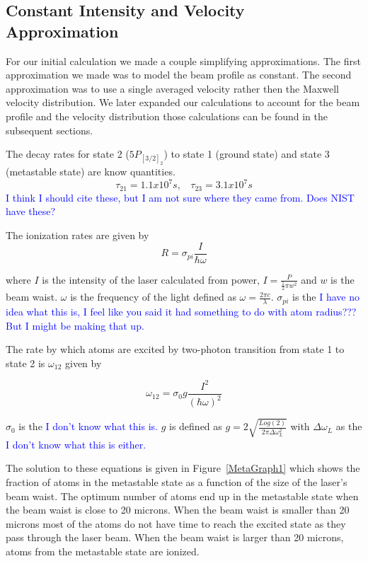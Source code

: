 \documentclass[prb,preprint]{revtex4-1}
\begin{document}
\subsection{Constant Intensity and Velocity Approximation} 

For our initial calculation we made a couple simplifying approximations. The first approximation we made was to model the beam profile as constant. The second approximation was to use a single averaged velocity rather then the Maxwell velocity distribution. We later expanded our calculations to account for the beam profile and the velocity distribution those calculations can be found in the subsequent sections. 

The decay rates for state 2 ($5P_{[3/2]_2}$) to state 1 (ground state) and state 3 (metastable state) are know quantities.
\begin{equation}
\label{DecayRates} 
\tau_{21} = 1.1x10^7 s, \	\	\	\	 \tau_{23} = 3.1x10^7s
\end{equation} 
\textcolor{blue}{I think I should cite these, but I am not sure where they came from. Does NIST have these?}

The ionization rates are given by 
\begin{equation}
\label{IonizationRates}
R = \sigma_{pi} \frac{I}{\hbar\omega}
\end{equation}

where $I$ is the intensity of the laser calculated from power, $I = \frac{P}{\frac{1}{2}\pi w^2}$ and $w$ is the beam waist. $\omega$ is the frequency of the light defined as $\omega = \frac{2\pi c}{\lambda}$. $\sigma_{pi}$ is the \textcolor{blue}{I have no idea what this is, I feel like you said it had something to do with atom radius??? But I might be making that up.} 

The rate by which atoms are excited by two-photon transition from state 1 to state 2 is $\omega_{12}$ given by

\begin{equation}
\label{ExcitationRate}
\omega_{12} = \sigma_0 g \frac{I^2}{(\hbar \omega)^2}
\end{equation}

$\sigma_0$ is the \textcolor{blue}{I don't know what this is.} $g$ is defined as $g = 2 \sqrt{\frac{Log(2)}{2 \pi \Delta \omega_L^2}}$ with $\Delta\omega_L$ as the \textcolor{blue}{I don't know what this is either.}

The solution to these equations is given in Figure~\ref{MetaGraph1} which shows the fraction of atoms in the metastable state as a function of the size of the laser's beam waist. The optimum number of atoms end up in the metastable state when the beam waist is close to 20 microns. When the beam waist is smaller than 20 microns most of the atoms do not have time to reach the excited state as they pass through the laser beam. When the beam waist is larger than 20 microns, atoms from the metastable state are ionized.
\end{document}
